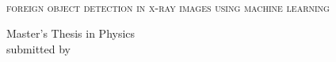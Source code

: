 \begin{whole}
	\centering
	{}
	\\[.8cm]
	{\firalight\fontsize{28}{28}\selectfont\scshape\MakeLowercase{Foreign object detection in x-ray images using machine learning}}
	
	\vfill
	
	Master's Thesis in Physics\\
	submitted by\\
	\vspace{0.5cm}
	\\
	\vspace{0.5cm}
	
	
\end{whole}